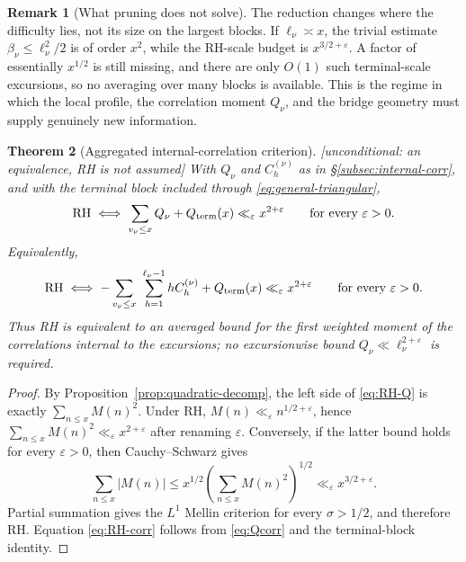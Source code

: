 \documentclass[11pt,reqno]{amsart}
\theoremstyle{plain}
\newtheorem{theorem}{Theorem}[section]
\theoremstyle{definition}
\newtheorem{remark}[theorem]{Remark}
\newcommand{\eps}{\varepsilon}
\begin{document}
\begin{remark}[What pruning does not solve]
\label{rem:pruning-limit}
The reduction changes where the difficulty lies, not its size on the
largest blocks. If $\ell_\nu\asymp x$, the trivial estimate
$\beta_\nu\le\ell_\nu^2/2$ is of order $x^2$, while the RH-scale
budget is $x^{3/2+\eps}$. A factor of essentially $x^{1/2}$ is still
missing, and there are only $O(1)$ such terminal-scale excursions, so no
averaging over many blocks is available. This is the regime in which the
local profile, the correlation moment $Q_\nu$, and the bridge geometry
must supply genuinely new information.
\end{remark}

\begin{theorem}[Aggregated internal-correlation criterion]
\label{thm:corr-criterion}
\emph{[unconditional: an equivalence, RH is not assumed]} With $Q_\nu$ and
$C_h^{(\nu)}$ as in \S\ref{subsec:internal-corr}, and with the terminal
block included through \eqref{eq:general-triangular},
\begin{equation}
\label{eq:RH-Q}
  \mathrm{RH}
  \iff
  \sum_{v_\nu\le x}Q_\nu+Q_{\rm term}(x)
  \ll_\eps x^{2+\eps}
  \qquad\text{for every }\eps>0.
\end{equation}
Equivalently,
\begin{equation}
\label{eq:RH-corr}
  \mathrm{RH}
  \iff
  -\sum_{v_\nu\le x}\ \sum_{h=1}^{\ell_\nu-1}
  hC_h^{(\nu)}+Q_{\rm term}(x)
  \ll_\eps x^{2+\eps}
  \qquad\text{for every }\eps>0.
\end{equation}
Thus RH is equivalent to an averaged bound for the first weighted moment of
the correlations internal to the excursions; no excursionwise bound
$Q_\nu\ll\ell_\nu^{2+\eps}$ is required.
\end{theorem}

\begin{proof}
By Proposition~\ref{prop:quadratic-decomp}, the left side of
\eqref{eq:RH-Q} is exactly $\sum_{n\le x}M(n)^2$.  Under RH,
$M(n)\ll_\eps n^{1/2+\eps}$, hence
$\sum_{n\le x}M(n)^2\ll_\eps x^{2+\eps}$ after renaming $\eps$.
Conversely, if the latter bound holds for every $\eps>0$, then
Cauchy--Schwarz gives
\[
  \sum_{n\le x}|M(n)|
  \le x^{1/2}\left(\sum_{n\le x}M(n)^2\right)^{1/2}
  \ll_\eps x^{3/2+\eps}.
\]
Partial summation gives the $L^1$ Mellin criterion for every
$\sigma>1/2$, and therefore RH.  Equation \eqref{eq:RH-corr} follows from
\eqref{eq:Qcorr} and the terminal-block identity.
\end{proof}
\end{document}
